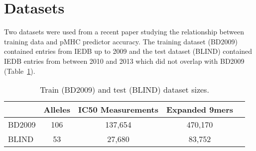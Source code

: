 \section{Datasets}

Two datasets were used from a recent paper studying the relationship between training data and pMHC predictor accuracy\cite{Kim_2014}. The training dataset (BD2009) contained entries from IEDB\cite{Salimi_2012} up to 2009 and the test dataset (BLIND) contained IEDB entries from between 2010 and 2013 which did not overlap with BD2009 (Table~\ref{tab:datasets}).

\begin{table}[h!]
\label{tab:datasets}

\begin{tabular}{l||cccc}
\toprule
{} & Alleles &  IC50 Measurements & Expanded 9mers \\
\midrule
BD2009 &     106 &                           137,654 &        470,170 \\
BLIND  &      53 &                           27,680 &         83,752 \\
\bottomrule
\end{tabular}


\caption{Train (BD2009) and test (BLIND) dataset sizes.}
\end{table}
